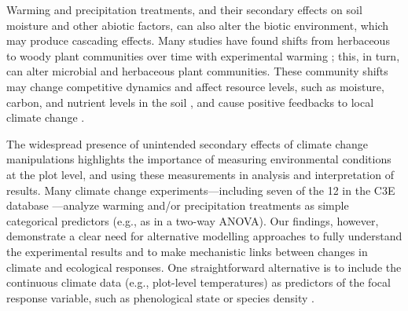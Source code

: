 \documentclass{article}
\begin{document}
\par Warming and precipitation treatments, and their secondary effects on soil moisture and other abiotic factors, can also alter the biotic environment, which may produce cascading effects. Many studies have found shifts from herbaceous to woody plant communities over time with experimental warming \citep[e.g.,][]{rollinson2012, mcdaniel2014,mcdaniel2014b, harte2015}; this, in turn, can alter microbial and herbaceous plant communities. These community shifts may change competitive dynamics and affect resource levels, such as moisture, carbon, and nutrient levels in the soil \citep{mcdaniel2014,mcdaniel2014b, harte2015}, and cause positive feedbacks to local climate change \citep{harte2015}. %

\par The widespread presence of unintended secondary effects of climate change manipulations highlights the importance of measuring environmental conditions at the plot level, and using these measurements in analysis and interpretation of results. Many climate change experiments---including seven of the 12 in the C3E database %
---analyze warming and/or precipitation treatments as simple categorical predictors (e.g., as in a two-way ANOVA). Our findings, however, demonstrate a clear need for alternative modelling approaches to fully understand the experimental results and to make mechanistic links between changes in climate and ecological responses. One straightforward alternative is to include the continuous climate data (e.g., plot-level temperatures) as predictors of the focal response variable, such as phenological state or species density \citep [e.g.,][]{marchin2015, pelini2014}. %
\end{document}
